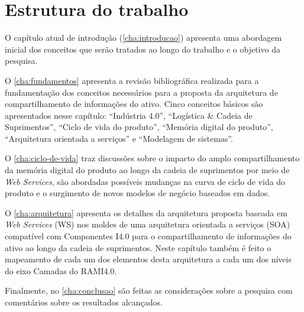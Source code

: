 

\section{Estrutura do trabalho}
\label{sec:estrutura}

O capítulo atual de introdução (\autoref{cha:introducao}) apresenta uma abordagem inicial dos conceitos que serão tratados ao longo do trabalho e o objetivo da pesquisa.


O \autoref{cha:fundamentos} apresenta a revisão bibliográfica realizada para a fundamentação dos conceitos necessários para a proposta da arquitetura de compartilhamento de informações do ativo. Cinco conceitos básicos são apresentados nesse capítulo: ``Indústria 4.0'', ``Logística \& Cadeia de Suprimentos'', ``Ciclo de vida do produto'', ``Memória digital do produto'', ``Arquitetura orientada a serviços'' e ``Modelagem de sistemas''.

O \autoref{cha:ciclo-de-vida} traz discussões sobre o impacto do amplo compartilhamento da memória digital do produto ao longo da cadeia de suprimentos por meio de \textit{Web Services}, são abordadas possíveis mudanças na curva de ciclo de vida do produto e o surgimento de novos modelos de negócio baseados em dados.

O \autoref{cha:arquitetura} apresenta os detalhes da arquitetura proposta baseada em \textit{Web Services} (WS) nos moldes de uma arquitetura orientada a serviços (SOA) compatível com Componentes I4.0 para o compartilhamento de informações do ativo ao longo da cadeia de suprimentos. Neste capítulo também é feito o mapeamento de cada um dos elementos desta arquitetura a cada um dos níveis do eixo Camadas do RAMI4.0.




Finalmente, no \autoref{cha:conclusao} são feitas as considerações sobre a pesquisa com comentários sobre os resultados alcançados.
